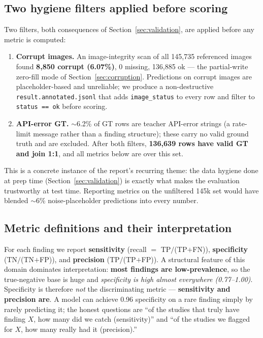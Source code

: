 \documentclass[11pt,a4paper]{article}
\begin{document}
\subsection{Two hygiene filters applied before scoring}
Two filters, both consequences of Section~\ref{sec:validation}, are applied before any metric is computed:
\begin{enumerate}[leftmargin=1.6em]
  \item \textbf{Corrupt images.} An image-integrity scan of all 145{,}735 referenced images found \textbf{8{,}850 corrupt (6.07\%)}, 0 missing, 136{,}885 ok --- the partial-write zero-fill mode of Section~\ref{sec:corruption}. Predictions on corrupt images are placeholder-based and unreliable; we produce a non-destructive \texttt{result.annotated.jsonl} that adds \texttt{image\_status} to every row and filter to \texttt{status == ok} before scoring.
  \item \textbf{API-error GT.} $\sim$6.2\% of GT rows are teacher API-error strings (a rate-limit message rather than a finding structure); these carry no valid ground truth and are excluded. After both filters, \textbf{136{,}639 rows have valid GT and join 1:1}, and all metrics below are over this set.
\end{enumerate}
This is a concrete instance of the report's recurring theme: the data hygiene done at prep time (Section~\ref{sec:validation}) is exactly what makes the evaluation trustworthy at test time. Reporting metrics on the unfiltered 145k set would have blended $\sim$6\% noise-placeholder predictions into every number.

\subsection{Metric definitions and their interpretation}
For each finding we report \textbf{sensitivity} (recall $=$ TP$/$(TP$+$FN)), \textbf{specificity} (TN$/$(TN$+$FP)), and \textbf{precision} (TP$/$(TP$+$FP)). A structural feature of this domain dominates interpretation: \textbf{most findings are low-prevalence}, so the true-negative base is huge and \emph{specificity is high almost everywhere (0.77--1.00)}. Specificity is therefore \emph{not} the discriminating metric --- \textbf{sensitivity and precision are}. A model can achieve 0.96 specificity on a rare finding simply by rarely predicting it; the honest questions are ``of the studies that truly have finding $X$, how many did we catch (sensitivity)'' and ``of the studies we flagged for $X$, how many really had it (precision).''
\end{document}
